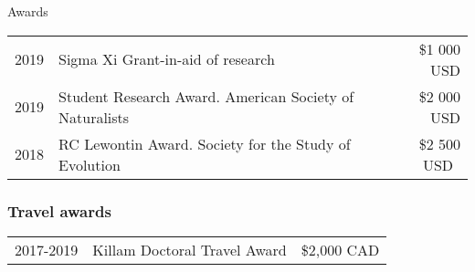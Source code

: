\documentclass[11pt]{article}
\begin{document}
\begin{rSection}{Awards}
\begin{tabular}{llr}
2019 & Sigma Xi Grant-in-aid of research & \$1 000 USD\\
2019 & Student Research Award. American Society of Naturalists & \$2 000 USD\\
2018 & RC Lewontin Award. Society for the Study of Evolution & \$2 500 USD\

\end{tabular}

\subsubsection*{Travel awards}
\begin{tabular}{llr}
2017-2019 & Killam Doctoral Travel Award  & \$2,000 CAD\\ %
\end{tabular}


\end{rSection}

\vspace{0.5em}


\end{document}
